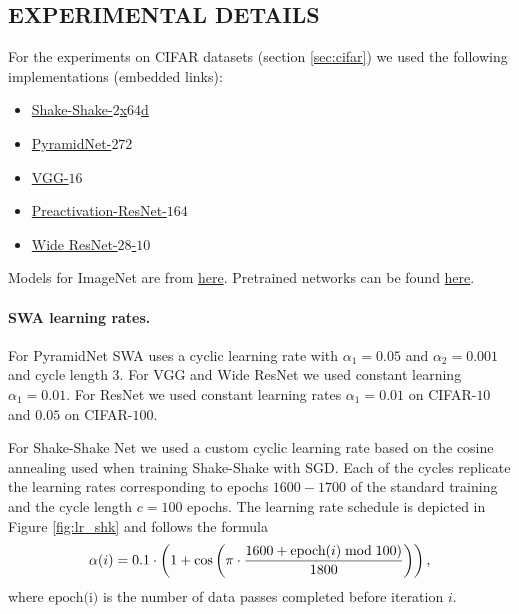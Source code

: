 \documentclass[letterpaper]{article}
\begin{document}
\subsection{EXPERIMENTAL DETAILS}
For the experiments on CIFAR datasets (section \ref{sec:cifar}) we used the 
following implementations (embedded links):
\begin{itemize}
	\item \href{https://github.com/hysts/pytorch_image_classification}{Shake-Shake-$2$x$64$d}
	\item \href{https://github.com/dyhan0920/PyramidNet-PyTorch}{PyramidNet-$272$}
	\item \href{https://github.com/pytorch/vision/blob/master/torchvision/models/vgg.py}{VGG-$16$}
	\item \href{https://github.com/bearpaw/pytorch-classification/blob/master/models/cifar/preresnet.py}{Preactivation-ResNet-$164$}
	\item \href{https://github.com/meliketoy/wide-resnet.pytorch/blob/master/networks/wide_resnet.py}{Wide ResNet-$28$-$10$}
\end{itemize}

Models for ImageNet are from \href{https://github.com/pytorch/vision/tree/master/torchvision}{here}.
Pretrained networks can be found \href{https://github.com/pytorch/pytorch/blob/master/torch/utils/model_zoo.py}{here}.

\paragraph{SWA learning rates.}
For PyramidNet SWA uses a cyclic learning rate with $\alpha_1 =0.05$ and 
$\alpha_2=0.001$ and cycle length $3$. 
For VGG and Wide ResNet we used constant learning $\alpha_1 = 0.01$. For ResNet 
we used constant learning rates $\alpha_1 = 0.01$ on CIFAR-$10$ and $0.05$ on
CIFAR-$100$. 

For Shake-Shake Net we used a custom cyclic learning rate based on the cosine
annealing used when training Shake-Shake with SGD. Each of the cycles replicate
the learning rates corresponding to epochs $1600-1700$ of the standard training
and the cycle length $c = 100$ epochs. The learning rate schedule is depicted in Figure
\ref{fig:lr_shk} and follows the formula
\begin{align}
  \notag
  \alpha(i) = 0.1 \cdot \left(1 + \cos\left(\pi\cdot \frac{1600 + { \text{epoch}(i)}\bmod{100})}{1800}\right)\right),
\end{align}
where $\text{epoch(i)}$ is the number of data passes completed before iteration
$i$.
\end{document}
